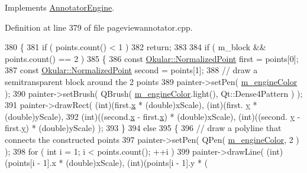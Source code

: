 Implements \hyperlink{classAnnotatorEngine_a71b2e9fcbcca36caadefa79adb99c93f}{Annotator\+Engine}.



Definition at line 379 of file pageviewannotator.\+cpp.


\begin{DoxyCode}
380         \{
381             \textcolor{keywordflow}{if} ( points.count() < 1 )
382                 \textcolor{keywordflow}{return};
383 
384             \textcolor{keywordflow}{if} ( m\_block && points.count() == 2 )
385             \{
386                 \textcolor{keyword}{const} \hyperlink{classOkular_1_1NormalizedPoint}{Okular::NormalizedPoint} first = points[0];
387                 \textcolor{keyword}{const} \hyperlink{classOkular_1_1NormalizedPoint}{Okular::NormalizedPoint} second = points[1];
388                 \textcolor{comment}{// draw a semitransparent block around the 2 points}
389                 painter->setPen( \hyperlink{classAnnotatorEngine_a8911b0455be7eedfb2c102ce19acdce2}{m\_engineColor} );
390                 painter->setBrush( QBrush( \hyperlink{classAnnotatorEngine_a8911b0455be7eedfb2c102ce19acdce2}{m\_engineColor}.light(), Qt::Dense4Pattern ) );
391                 painter->drawRect( (\textcolor{keywordtype}{int})(first.\hyperlink{classOkular_1_1NormalizedPoint_a857f49b9bc7712430d167472ef9dbd94}{x} * (\textcolor{keywordtype}{double})xScale), (\textcolor{keywordtype}{int})(first.
      \hyperlink{classOkular_1_1NormalizedPoint_ac2276daabda627d5f82bb1532c293047}{y} * (\textcolor{keywordtype}{double})yScale),
392                                    (\textcolor{keywordtype}{int})((second.\hyperlink{classOkular_1_1NormalizedPoint_a857f49b9bc7712430d167472ef9dbd94}{x} - first.\hyperlink{classOkular_1_1NormalizedPoint_a857f49b9bc7712430d167472ef9dbd94}{x}) * (\textcolor{keywordtype}{double})xScale), (\textcolor{keywordtype}{int})((second.
      \hyperlink{classOkular_1_1NormalizedPoint_ac2276daabda627d5f82bb1532c293047}{y} - first.\hyperlink{classOkular_1_1NormalizedPoint_ac2276daabda627d5f82bb1532c293047}{y}) * (\textcolor{keywordtype}{double})yScale) );
393             \}
394             \textcolor{keywordflow}{else}
395             \{
396                 \textcolor{comment}{// draw a polyline that connects the constructed points}
397                 painter->setPen( QPen( \hyperlink{classAnnotatorEngine_a8911b0455be7eedfb2c102ce19acdce2}{m\_engineColor}, 2 ) );
398                 \textcolor{keywordflow}{for} ( \textcolor{keywordtype}{int} i = 1; i < points.count(); ++i )
399                     painter->drawLine( (\textcolor{keywordtype}{int})(points[i - 1].x * (\textcolor{keywordtype}{double})xScale), (\textcolor{keywordtype}{int})(points[i - 1].y * (\textcolor{keywordtype}{
}
\end{DoxyCode}
